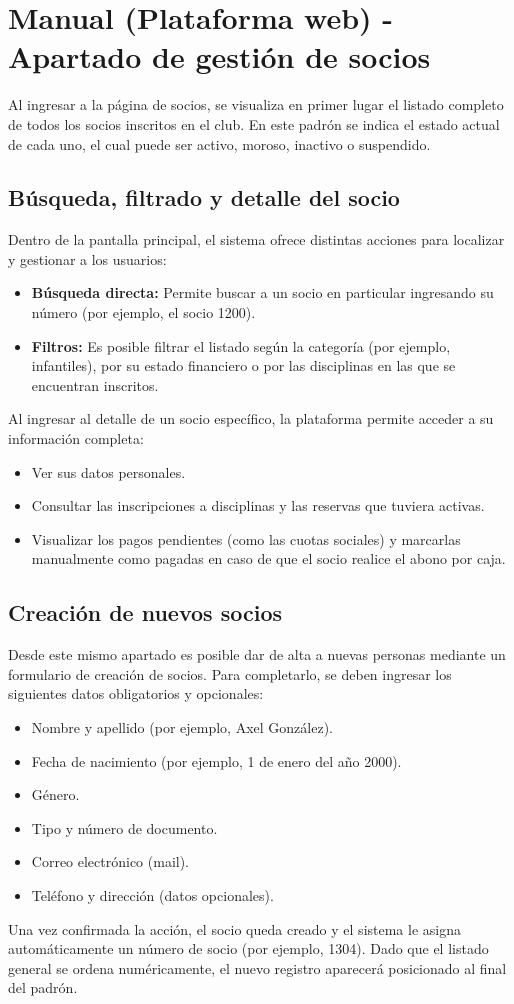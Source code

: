 \section{Manual (Plataforma web) - Apartado de gestión de socios}

Al ingresar a la página de socios, se visualiza en primer lugar el listado completo de todos los socios inscritos en el club. En este padrón se indica el estado actual de cada uno, el cual puede ser activo, moroso, inactivo o suspendido.

\subsection{Búsqueda, filtrado y detalle del socio}
Dentro de la pantalla principal, el sistema ofrece distintas acciones para localizar y gestionar a los usuarios:

\begin{itemize}
    \item \textbf{Búsqueda directa:} Permite buscar a un socio en particular ingresando su número (por ejemplo, el socio 1200).
    \item \textbf{Filtros:} Es posible filtrar el listado según la categoría (por ejemplo, infantiles), por su estado financiero o por las disciplinas en las que se encuentran inscritos.
\end{itemize}

Al ingresar al detalle de un socio específico, la plataforma permite acceder a su información completa:
\begin{itemize}
    \item Ver sus datos personales.
    \item Consultar las inscripciones a disciplinas y las reservas que tuviera activas.
    \item Visualizar los pagos pendientes (como las cuotas sociales) y marcarlas manualmente como pagadas en caso de que el socio realice el abono por caja.
\end{itemize}

\subsection{Creación de nuevos socios}
Desde este mismo apartado es posible dar de alta a nuevas personas mediante un formulario de creación de socios. Para completarlo, se deben ingresar los siguientes datos obligatorios y opcionales:

\begin{itemize}
    \item Nombre y apellido (por ejemplo, Axel González).
    \item Fecha de nacimiento (por ejemplo, 1 de enero del año 2000).
    \item Género.
    \item Tipo y número de documento.
    \item Correo electrónico (mail).
    \item Teléfono y dirección (datos opcionales).
\end{itemize}

Una vez confirmada la acción, el socio queda creado y el sistema le asigna automáticamente un número de socio (por ejemplo, 1304). Dado que el listado general se ordena numéricamente, el nuevo registro aparecerá posicionado al final del padrón.
